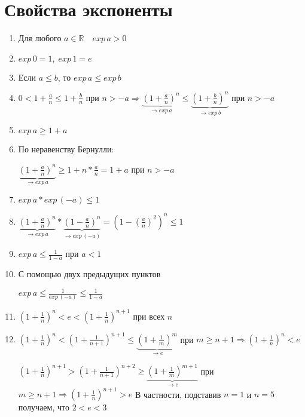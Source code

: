 \documentclass[12pt,letterpaper]{report}
\makeatletter
\renewenvironment{proof}[1][\proofname]{%
   \par\pushQED{\qed}\normalfont%
   \topsep6\p@\@plus6\p@\relax
   \trivlist\item[\hskip\labelsep\bfseries#1\@addpunct{.}]%
   \ignorespaces
}{%
   \popQED\endtrivlist\@endpefalse
}
\makeatother
\begin{document}
\section{Свойства экспоненты}
\begin{enumerate}
    \item Для любого $a \in \mathbb{R} \quad exp\,a > 0$
    \item $exp\,0 = 1,\; exp\,1 = e$
    \item Если $a \leqslant b$, то $exp\,a \leqslant exp\,b$
    \begin{proof}
        $0 < 1 + \frac{a}{n} \leqslant 1 + \frac{b}{n}$ при $n > -a \Rightarrow \underbrace{(1 + \frac{a}{n})^n}_{\to exp\,a} \leqslant \underbrace{(1 + \frac{b}{n})^n}_{\to exp\,b}$ при $n > -a$
    \end{proof}
    \item $exp\,a \geqslant 1 + a$
    \begin{proof}
        По неравенству Бернулли:
        
        $\underbrace{(1 + \frac{a}{n})^n}_{\to exp\,a} \geqslant 1 + n * \frac{a}{n} = 1 + a$ при $n > -a$
    \end{proof}
    \item $exp\,a * exp\,(-a) \leqslant 1$
    \begin{proof}
        $\underbrace{(1 + \frac{a}{n})^n}_{\to exp\,a} * \underbrace{(1 - \frac{a}{n})^n}_{\to exp\,(-a)} = (1 - (\frac{a}{n})^2)^n \leqslant 1$
    \end{proof}
    \item $exp\,a \leqslant \frac{1}{1 - a}$ при $a < 1$
    \begin{proof}
        С помощью двух предыдущих пунктов
        
        $exp\,a \leqslant\frac{1}{exp\,(-a)} \leqslant \frac{1}{1 - a}$
    \end{proof}
    \item $(1 + \frac{1}{n})^n < e < (1 + \frac{1}{n})^{n + 1}$ при всех $n$
    \begin{proof}
        $(1 + \frac{1}{n})^n < (1 + \frac{1}{n+1})^{n+1} \leqslant \underbrace{(1 + \frac{1}{m})^{m}}_{\to e}$ при $m
        \geqslant n + 1 \Rightarrow (1 + \frac{1}{n})^n < e$
        
        $(1 + \frac{1}{n})^{n + 1} > (1 + \frac{1}{n+1})^{n + 2} \geqslant \underbrace{(1 + \frac{1}{m})^{m + 1}}_{\to e}$ при $m \geqslant n + 1 \Rightarrow (1 + \frac{1}{n})^{n + 1} > e$
    \end{proof}
    В частности, подставив $n = 1$ и $n = 5$ получаем, что $2 < e < 3$
\end{enumerate}
\end{document}

